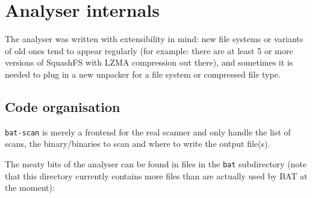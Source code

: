 \documentclass[10pt,a4paper]{article}
\begin{document}
\section{Analyser internals}

The analyser was written with extensibility in mind: new file systems or
variants of old ones tend to appear regularly (for example: there are at
least 5 or more versions of SquashFS with LZMA compression out there), and
sometimes it is needed to plug in a new unpacker for a file system or
compressed file type.

\subsection{Code organisation}

\texttt{bat-scan} is merely a frontend for the real scanner and only handle
the list of scans, the binary/binaries to scan and where to write the output
file(s).

The meaty bits of the analyser can be found in files in the \texttt{bat}
subdirectory (note that this directory currently contains more files than are
actually used by BAT at the moment):
\end{document}
